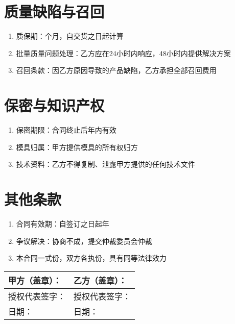 \documentclass[UTF8]{ctexart}
\begin{document}
\section{质量缺陷与召回}
\begin{enumerate}
    \item 质保期：\underline{\hspace{2cm}}个月，自交货之日起计算
    \item 批量质量问题处理：乙方应在24小时内响应，48小时内提供解决方案
    \item 召回条款：因乙方原因导致的产品缺陷，乙方承担全部召回费用
\end{enumerate}

\section{保密与知识产权}
\begin{enumerate}
    \item 保密期限：合同终止后\underline{\hspace{1cm}}年内有效
    \item 模具归属：甲方提供模具的所有权归\underline{\hspace{3cm}}方
    \item 技术资料：乙方不得复制、泄露甲方提供的任何技术文件
\end{enumerate}

\section{其他条款}
\begin{enumerate}
    \item 合同有效期：自签订之日起\underline{\hspace{1cm}}年
    \item 争议解决：协商不成，提交\underline{\hspace{3cm}}仲裁委员会仲裁
    \item 本合同一式\underline{\hspace{1cm}}份，双方各执\underline{\hspace{1cm}}份，具有同等法律效力
\end{enumerate}

\vspace{2cm}
\begin{tabular}{p{8cm}p{8cm}}
甲方（盖章）： & 乙方（盖章）： \\
\hline
授权代表签字： & 授权代表签字： \\
日期： \underline{\hspace{3cm}} & 日期： \underline{\hspace{3cm}} \\
\end{tabular}
\end{document}
